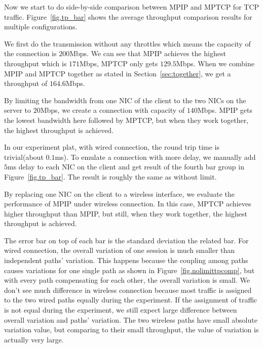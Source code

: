 Now we start to do side-by-side comparison between MPIP and MPTCP for TCP traffic. Figure~\ref{fig.tp_bar} shows the average throughput comparison results for multiple configurations. 

We first do the transmission without any throttles which means the capacity of the connection is $200$Mbps. We can see that MPIP achieves the highest throughput which is $171$Mbps, MPTCP only gets $129.5$Mbps. When we combine MPIP and MPTCP together as stated in Section~\ref{sec:together}, we get a throughput of $164.6$Mbps.


By limiting the bandwidth from one NIC of the client to the two NICs on the server to $20$Mbps, we create a connection with capacity of $140$Mbps. MPIP gets the lowest bandwidth here followed by MPTCP, but when they work together, the highest throughput is achieved.

In our experiment plat, with wired connection, the round trip time is trivial(about $0.1$ms). To emulate a connection with more delay, we manually add $5$ms delay to each NIC on the client and get result of the fourth bar group in Figure~\ref{fig.tp_bar}. The result is roughly the same as without limit.

By replacing one NIC on the client to a wireless interface, we evaluate the performance of MPIP under wireless connection. In this case, MPTCP achieves higher throughput than MPIP, but still, when they work together, the highest throughput is achieved.

The error bar on top of each bar is the standard deviation the related bar. For wired connection, the overall variation of one session is much smaller than independent paths' variation. This happens because the coupling among paths causes variations for one single path as shown in Figure~\ref{fig.nolimittpcomp}, but with every path compensating for each other, the overall variation is small. We don't see much difference in wireless connection because most traffic is assigned to the two wired paths equally during the experiment. If the assignment of traffic is not equal during the experiment, we still expect large difference between overall variation and paths' variation. The two wireless paths have small absolute variation value, but comparing to their small throughput, the value of variation is actually very large.

